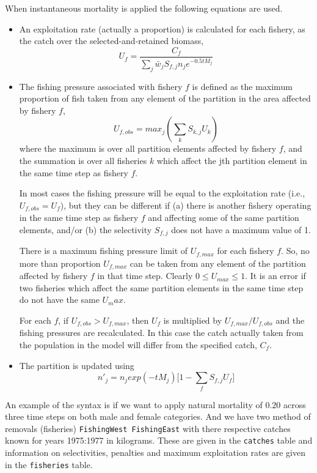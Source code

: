 When instantaneous mortality is applied the following equations are used.

\begin{itemize}
	\item An exploitation rate (actually a proportion) is calculated for each fishery, as the catch over the selected-and-retained biomass,
	$$ U_f = \frac{C_f}{\sum_j \bar{w}_jS_{f,j}n_j e^{-0.5tM_j}}$$
	\item The fishing pressure associated with fishery $f$ is defined as the maximum proportion of fish taken from any element of the partition in the area affected by fishery $f$,
	$$ U_{f,obs} = max_j(\sum_k S_{k,j}U_k) $$
	where the maximum is over all partition elements affected by fishery $f$, and the summation is over all fisheries $k$ which affect the jth partition element in the same time step as fishery $f$.
	
In most cases the fishing pressure will be equal to the exploitation rate (i.e., $U_{f,obs} = U_f$), but they can be different if (a) there is another fishery operating in the same time step as fishery $f$ and affecting some of the same partition elements, and/or (b) the selectivity $S_{f,j}$ does not have a maximum value of 1.
	
There is a maximum fishing pressure limit of $U_{f,max}$ for each fishery $f$. So, no more than proportion $U_{f,max}$ can be taken from any element of the partition affected by fishery $f$ in that time step. Clearly $0 \leq U_{max} \leq 1$. It is an error if two fisheries which affect the same partition elements in the same time step do not have the same $U_max$.

For each $f$, if $U_{f,obs} > U_{f,max}$, then $U_f$ is multiplied by $U_{f,max}/U_{f,obs}$ and the fishing pressures are recalculated. In this case the catch actually taken from the population in the model will differ from the specified catch, $C_f$.
	
\item The partition is updated using
	$$ n'_j = n_j exp(-tM_j)\big[1 - \sum_f S_{f,j} U_f \big] $$ 
\end{itemize}

An example of the syntax is if we want to apply natural mortality of $0.20$ across three time steps on both male and female categories. And we have two method of removals (fisheries) \texttt{FishingWest FishingEast} with there respective catches known for years 1975:1977 in kilograms. These are given in the \texttt{catches} table and information on selectivities, penalties and maximum exploitation rates are given in the \texttt{fisheries} table.

